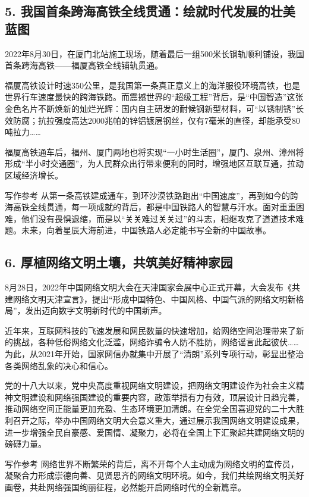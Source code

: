 \subsection*{5. 我国首条跨海高铁全线贯通：绘就时代发展的壮美蓝图}

2022年8月30日，在厦门北站施工现场，随着最后一组500米长钢轨顺利铺设，我国首条跨海高铁——福厦高铁全线铺轨贯通。

福厦高铁设计时速350公里，是我国第一条真正意义上的海洋服役环境高铁，也是世界行车速度最快的跨海铁路。而震撼世界的“超级工程”背后，是“中国智造”这张金色名片不断焕新的灿烂光辉：国内自主研发的耐候钢新型材料，可“以锈制锈”长效防腐；抗拉强度高达2000兆帕的锌铝镀层钢丝，仅有7毫米的直径，却能承受80吨拉力……

福厦高铁通车后，福州、厦门两地也将实现“一小时生活圈”，厦门、泉州、漳州将形成“半小时交通圈”，为人民群众出行带来便利的同时，增强地区互联互通，拉动区域经济增长。

\begin{quoteBox}{写作参考}
从第一条高铁建成通车，到环沙漠铁路跑出“中国速度”，再到如今的跨海高铁全线贯通，每一项成就的背后，都是中国铁路人的智慧与汗水。面对重重困难，他们没有畏惧退缩，而是以“关关难过关关过”的斗志，相继攻克了道道技术难题。未来，向着星辰大海前进，中国铁路人必定能书写全新的中国故事。
\end{quoteBox}

\subsection*{6. 厚植网络文明土壤，共筑美好精神家园}

8月28日，2022年中国网络文明大会在天津国家会展中心正式开幕，大会发布《共建网络文明天津宣言》，提出“形成中国特色、中国风格、中国气派的网络文明新格局”，发出迈向数字文明新时代的中国新声。

近年来，互联网科技的飞速发展和网民数量的快速增加，给网络空间治理带来了新的挑战，各种低俗网络文化泛滥，网络诈骗令人防不胜防，网络谣言此起彼伏……为此，从2021年开始，国家网信办就集中开展了“清朗”系列专项行动，彰显出整治各类网络乱象的决心和信心。

党的十八大以来，党中央高度重视网络文明建设，把网络文明建设作为社会主义精神文明建设和网络强国建设的重要内容，政策举措有力有效，顶层设计日趋完善，推动网络空间正能量更加充盈、生态环境更加清朗。在全党全国喜迎党的二十大胜利召开之际，举办中国网络文明大会意义重大，通过展示我国网络文明建设成果，进一步增强全民自豪感、爱国情、凝聚力，必将在全国上下汇聚起共建网络文明的磅礴力量。

\begin{quoteBox}{写作参考}
网络世界不断繁荣的背后，离不开每个人主动成为网络文明的宣传员，凝聚合力形成崇德向善、见贤思齐的网络文明环境。如今，我们共绘网络文明美好画卷，共赴网络强国绚丽征程，必然能开启网络时代的全新篇章。
\end{quoteBox}

